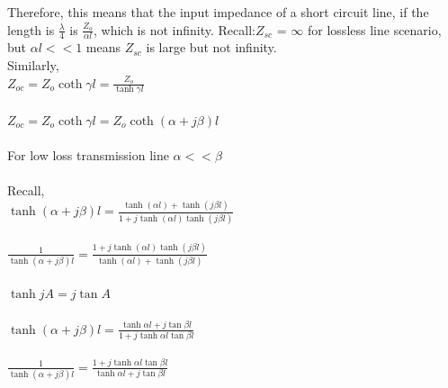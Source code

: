 Therefore, this means that the input impedance of a short circuit line, if the length is $ \frac{\lambda}{4} $ is $ \frac{Z_{o}}{\alpha l} $, which is not infinity. Recall:$ Z_{sc} $ = $ \infty $ for lossless line scenario, but $ \alpha l << 1 $ means $ Z_{sc} $ is large but not infinity.\\

Similarly,\\
 $ Z_{oc}=Z_{o}\coth\gamma l=\frac{Z_{o}}{\tanh\gamma l} $\\\\
$ Z_{oc}=Z_{o}\coth\gamma l=Z_{o}\coth(\alpha+j\beta) l $\\\\
For low loss transmission line $ \alpha<<\beta $ \\\\Recall,\\
$ \tanh(\alpha+j\beta)l=\frac{\tanh (\alpha l) + \tanh (j\beta l)}{1 +j \tanh (\alpha l)\tanh (j\beta l)} $\\\\
$ \frac{1}{\tanh(\alpha+j\beta)l}=\frac{1 + j\tanh (\alpha l)\tanh (j\beta l)}{\tanh (\alpha l) + \tanh (j\beta l)} $\\\\
$ \tanh jA= j \tan A $\\\\
$ \tanh(\alpha+j\beta)l=\frac{\tanh \alpha l+j\tan \beta l}{1+j\tanh \alpha l\tan \beta l} $\\\\
$ \frac{1}{\tanh(\alpha+j\beta)l}=\frac{1+j\tanh \alpha l\tan \beta l}{\tanh \alpha l+j\tan \beta l} $

